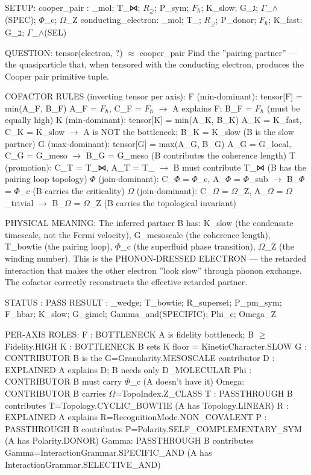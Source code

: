 \documentclass[12pt,a4paper]{article}
\begin{document}
SETUP:
cooper\_pair       : \langleD\_mol; T\_⋈; $R_{\supseteq}$; P\_sym; $F_{\hbar}$; K\_slow; G\_ג; $\Gamma$\_$\land$(SPEC); $\Phi$\_c; $\Omega$\_Z\rangle
conducting\_electron: \langleD\_mol; T\_\textbar{}; $R_{\supseteq}$; P\_donor; $F_{\hbar}$; K\_fast; G\_ב; $\Gamma$\_$\land$(SEL)\rangle

QUESTION: tensor(electron, ?) $\approx$ cooper\_pair
Find the ''pairing partner'' --- the quasiparticle that, when tensored with
the conducting electron, produces the Cooper pair primitive tuple.

COFACTOR RULES (inverting tensor per axis):
F (min-dominant): tensor{[}F{]} = min(A\_F, B\_F)
A\_F = $F_{\hbar}$, C\_F = $F_{\hbar}$ $\rightarrow$ A explains F; B\_F = $F_{\hbar}$ (must be equally high)
K (min-dominant): tensor{[}K{]} = min(A\_K, B\_K)
A\_K = K\_fast, C\_K = K\_slow $\rightarrow$ A is NOT the bottleneck; B\_K = K\_slow (B is the slow partner)
G (max-dominant): tensor{[}G{]} = max(A\_G, B\_G)
A\_G = G\_local, C\_G = G\_meso $\rightarrow$ B\_G = G\_meso (B contributes the coherence length)
T (promotion): C\_T = T\_⋈, A\_T = T\_\textbar{} $\rightarrow$ B must contribute T\_⋈ (B has the pairing loop topology)
$\Phi$ (join-dominant): C\_$\Phi$ = $\Phi$\_c, A\_$\Phi$ = $\Phi$\_sub $\rightarrow$ B\_$\Phi$ = $\Phi$\_c (B carries the criticality)
$\Omega$ (join-dominant): C\_$\Omega$ = $\Omega$\_Z, A\_$\Omega$ = $\Omega$\_trivial $\rightarrow$ B\_$\Omega$ = $\Omega$\_Z (B carries the topological invariant)

PHYSICAL MEANING:
The inferred partner B has: K\_slow (the condensate timescale, not the Fermi velocity),
G\_mesoscale (the coherence length), T\_bowtie (the pairing loop),
$\Phi$\_c (the superfluid phase transition), $\Omega$\_Z (the winding number).
This is the PHONON-DRESSED ELECTRON --- the retarded interaction that
makes the other electron ''look slow'' through phonon exchange.
The cofactor correctly reconstructs the effective retarded partner.

STATUS   : PASS
RESULT   : \langleD\_wedge; T\_bowtie; R\_superset; P\_pm\_sym; F\_hbar; K\_slow; G\_gimel; Gamma\_and(SPECIFIC); Phi\_c; Omega\_Z\rangle

PER-AXIS ROLES:
F    : BOTTLENECK       A is fidelity bottleneck; B $\geq$ Fidelity.HIGH
K    : BOTTLENECK       B sets K floor = KineticCharacter.SLOW
G    : CONTRIBUTOR      B is the G=Granularity.MESOSCALE contributor
D    : EXPLAINED        A explains D; B needs only D\_MOLECULAR
Phi  : CONTRIBUTOR      B must carry $\Phi$\_c (A doesn't have it)
Omega: CONTRIBUTOR      B carries $\Omega$=TopoIndex.Z\_CLASS
T    : PASSTHROUGH      B contributes T=Topology.CYCLIC\_BOWTIE (A has Topology.LINEAR)
R    : EXPLAINED        A explains R=RecognitionMode.NON\_COVALENT
P    : PASSTHROUGH      B contributes P=Polarity.SELF\_COMPLEMENTARY\_SYM (A has Polarity.DONOR)
Gamma: PASSTHROUGH      B contributes Gamma=InteractionGrammar.SPECIFIC\_AND (A has InteractionGrammar.SELECTIVE\_AND)
\end{document}
